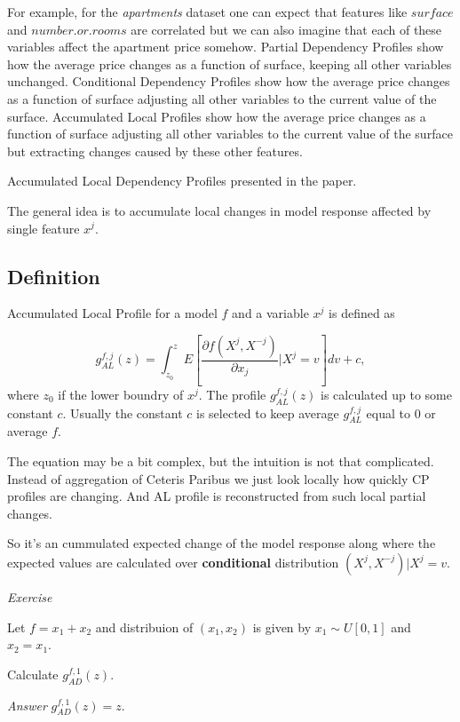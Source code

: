 \documentclass[12pt,]{krantz}
\theoremstyle{definition}
\theoremstyle{definition}
\theoremstyle{definition}
\theoremstyle{remark}
\begin{document}
For example, for the \emph{apartments} dataset one can expect that
features like \(surface\) and \(number.or.rooms\) are correlated but we
can also imagine that each of these variables affect the apartment price
somehow. Partial Dependency Profiles show how the average price changes
as a function of surface, keeping all other variables unchanged.
Conditional Dependency Profiles show how the average price changes as a
function of surface adjusting all other variables to the current value
of the surface. Accumulated Local Profiles show how the average price
changes as a function of surface adjusting all other variables to the
current value of the surface but extracting changes caused by these
other features.

Accumulated Local Dependency Profiles presented in the \citep{R-ALEPlot}
paper.

The general idea is to accumulate local changes in model response
affected by single feature \(x^j\).

\hypertarget{definition-2}{%
\subsection{Definition}\label{definition-2}}

Accumulated Local Profile for a model \(f\) and a variable \(x^j\) is
defined as

\[
g_{AL}^{f, j}(z) = \int_{z_0}^z E\left[\frac{\partial f(X^j, X^{-j})}{\partial x_j}|X^j = v\right] dv + c,
\] where \(z_0\) if the lower boundry of \(x^j\). The profile
\(g_{AL}^{f, j}(z)\) is calculated up to some constant \(c\). Usually
the constant \(c\) is selected to keep average \(g_{AL}^{f, j}\) equal
to 0 or average \(f\).

The equation may be a bit complex, but the intuition is not that
complicated. Instead of aggregation of Ceteris Paribus we just look
locally how quickly CP profiles are changing. And AL profile is
reconstructed from such local partial changes.

So it's an cummulated expected change of the model response along where
the expected values are calculated over \textbf{conditional}
distribution \((X^j,X^{-j})|X^j=v\).

\emph{Exercise}

Let \(f = x_1 + x_2\) and distribuion of \((x_1, x_2)\) is given by
\(x_1 \sim U[0,1]\) and \(x_2=x_1\).

Calculate \(g_{AD}^{f, 1}(z)\).

\emph{Answer} \(g_{AD}^{f, 1}(z) = z\).
\end{document}

